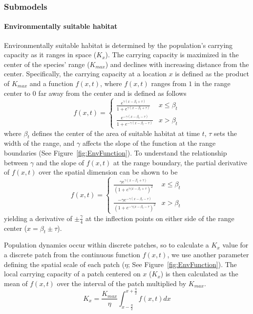 \documentclass[11pt, oneside]{article}
\begin{document}
\subsubsection{Submodels}
\paragraph{Environmentally suitable habitat}
Environmentally suitable habitat is determined by the population's carrying capacity as it ranges in space ($K_{x}$). The carrying capacity is maximized in the center of the species' range ($K_{max}$) and declines with increasing distance from the center. Specifically, the carrying capacity at a location $x$ is defined as the product of $K_{max}$ and a function $f(x,t)$, where $f(x,t)$ ranges from $1$ in the range center to $0$ far away from the center and is defined as follows 
\begin{equation}
f(x,t)=
\begin{cases}
	\frac{e^{\gamma(x-\beta_{t}+\tau)}}{1+e^{\gamma(x-\beta_{t}+\tau)}} & x \leq \beta_{t} \\
	\frac{e^{-\gamma(x-\beta_{t}-\tau)}}{1+e^{-\gamma(x-\beta_{t}-\tau)}} & x > \beta_{t}
\end{cases}
\end{equation}
where $\beta_{t}$ defines the center of the area of suitable habitat at time $t$, $\tau$ sets the width of the range, and $\gamma$ affects the slope of the function at the range boundaries (See Figure~\ref{fig:EnvFunction}). To understand the relationship between $\gamma$ and the slope of $f(x,t)$ at the range boundary, the partial derivative of $f(x,t)$ over the spatial dimension can be shown to be
\begin{equation}
f(x,t)=
\begin{cases}
	\frac{\gamma e^{\gamma(x-\beta_{t}+\tau)}}{(1+e^{\gamma(x-\beta_{t}+\tau})^{2}} & x \leq \beta_{t} \\
	\frac{-\gamma e^{-\gamma(x-\beta_{t}-\tau)}}{(1+e^{-\gamma(x-\beta_{t}-\tau})^{2}} & x > \beta_{t}
\end{cases}	
\end{equation}
yielding a derivative of $\pm\frac{\gamma}{4}$ at the inflection points on either side of the range center ($x=\beta_{t}\pm\tau$).

Population dynamics occur within discrete patches, so to calculate a $K_{x}$ value for a discrete patch from the continuous function $f(x,t)$, we use another parameter defining the spatial scale of each patch ($\eta$; See Figure~\ref{fig:EnvFunction}). The local carrying capacity of a patch centered on $x$ ($K_{x}$) is then calculated as the mean of $f(x,t)$ over the interval of the patch multiplied by $K_{max}$.
\begin{equation}
K_{x} = \frac{K_{max}}{\eta}\int_{x-\frac{\eta}{2}}^{x+\frac{\eta}{2}}f(x,t)dx
\end{equation}
\end{document}

